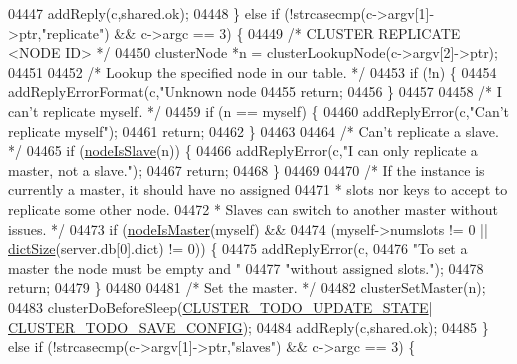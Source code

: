 \begin{DoxyCode}
{{{{{{{{{{{{{{{{{{{{{{{{{{{{{{{{{{{{{{{{{{{{{{{{{{{{{{{{{{{{{{{{{{{{{{{{{{{{{{{{{{{{{{{{{{{{{{{{{{{{{04447         addReply(c,shared.ok);
04448     \} \textcolor{keywordflow}{else} \textcolor{keywordflow}{if} (!strcasecmp(c->argv[1]->ptr,\textcolor{stringliteral}{"replicate"}) && c->argc == 3) \{
04449         \textcolor{comment}{/* CLUSTER REPLICATE <NODE ID> */}
04450         clusterNode *n = clusterLookupNode(c->argv[2]->ptr);
04451 
04452         \textcolor{comment}{/* Lookup the specified node in our table. */}
04453         \textcolor{keywordflow}{if} (!n) \{
04454             addReplyErrorFormat(c,\textcolor{stringliteral}{"Unknown node %
04455             \textcolor{keywordflow}{return};
04456         \}
04457 
04458         \textcolor{comment}{/* I can't replicate myself. */}
04459         \textcolor{keywordflow}{if} (n == myself) \{
04460             addReplyError(c,\textcolor{stringliteral}{"Can't replicate myself"});
04461             \textcolor{keywordflow}{return};
04462         \}
04463 
04464         \textcolor{comment}{/* Can't replicate a slave. */}
04465         \textcolor{keywordflow}{if} (\hyperlink{cluster_8h_a3c99881f6892130c902b42b1f84a0e11}{nodeIsSlave}(n)) \{
04466             addReplyError(c,\textcolor{stringliteral}{"I can only replicate a master, not a slave."});
04467             \textcolor{keywordflow}{return};
04468         \}
04469 
04470         \textcolor{comment}{/* If the instance is currently a master, it should have no assigned}
04471 \textcolor{comment}{         * slots nor keys to accept to replicate some other node.}
04472 \textcolor{comment}{         * Slaves can switch to another master without issues. */}
04473         \textcolor{keywordflow}{if} (\hyperlink{cluster_8h_a2d8e84269474d8750565fb3fb67aa436}{nodeIsMaster}(myself) &&
04474             (myself->numslots != 0 || \hyperlink{dict_8h_af193430dd3d5579a52b194512f72c1f0}{dictSize}(server.db[0].dict) != 0)) \{
04475             addReplyError(c,
04476                 \textcolor{stringliteral}{"To set a master the node must be empty and "}
04477                 \textcolor{stringliteral}{"without assigned slots."});
04478             \textcolor{keywordflow}{return};
04479         \}
04480 
04481         \textcolor{comment}{/* Set the master. */}
04482         clusterSetMaster(n);
04483         clusterDoBeforeSleep(\hyperlink{cluster_8h_abea0d393cba342261e4a7e6fb745f388}{CLUSTER\_TODO\_UPDATE\_STATE}|
      \hyperlink{cluster_8h_a0ae5ff08fbae3c655012b4de8bfc327d}{CLUSTER\_TODO\_SAVE\_CONFIG});
04484         addReply(c,shared.ok);
04485     \} \textcolor{keywordflow}{else} \textcolor{keywordflow}{if} (!strcasecmp(c->argv[1]->ptr,\textcolor{stringliteral}{"slaves"}) && c->argc == 3) \{
}}}}}}}}}}}}}}}}}}}}}}}}}}}}}}}}}}}}}}}}}}}}}}}}}}}}}}}}}}}}}}}}}}}}}}}}}}}}}}}}}}}}}}}}}}}}}}}}}}}}}}
\end{DoxyCode}
